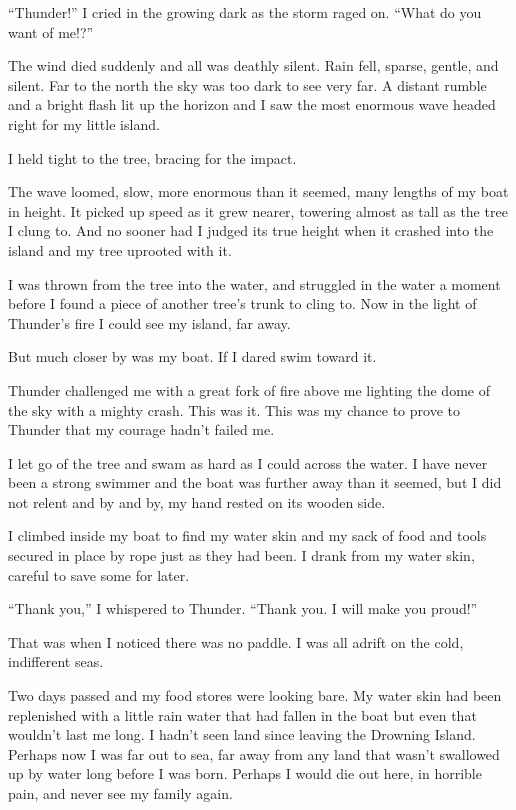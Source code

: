 ``Thunder!'' I cried in the growing dark as the storm raged on. ``What do you want of me!?''

The wind died suddenly and all was deathly silent. Rain fell, sparse, gentle, and silent. Far to the north the sky was too dark to see very far. A distant rumble and a bright flash lit up the horizon and I saw the most enormous wave headed right for my little island.

I held tight to the tree, bracing for the impact.

The wave loomed, slow, more enormous than it seemed, many lengths of my boat in height. It picked up speed as it grew nearer, towering almost as tall as the tree I clung to. And no sooner had I judged its true height when it crashed into the island and my tree uprooted with it.

I was thrown from the tree into the water, and struggled in the water a moment before I found a piece of another tree's trunk to cling to. Now in the light of Thunder's fire I could see my island, far away.

But much closer by was my boat. If I dared swim toward it.

Thunder challenged me with a great fork of fire above me lighting the dome of the sky with a mighty crash. This was it. This was my chance to prove to Thunder that my courage hadn't failed me.

I let go of the tree and swam as hard as I could across the water. I have never been a strong swimmer and the boat was further away than it seemed, but I did not relent and by and by, my hand rested on its wooden side.

I climbed inside my boat to find my water skin and my sack of food and tools secured in place by rope just as they had been. I drank from my water skin, careful to save some for later.

``Thank you,'' I whispered to Thunder. ``Thank you. I will make you proud!''

That was when I noticed there was no paddle. I was all adrift on the cold, indifferent seas.

\secdiv

Two days passed and my food stores were looking bare. My water skin had been replenished with a little rain water that had fallen in the boat but even that wouldn't last me long. I hadn't seen land since leaving the Drowning Island. Perhaps now I was far out to sea, far away from any land that wasn't swallowed up by water long before I was born. Perhaps I would die out here, in horrible pain, and never see my family again.

